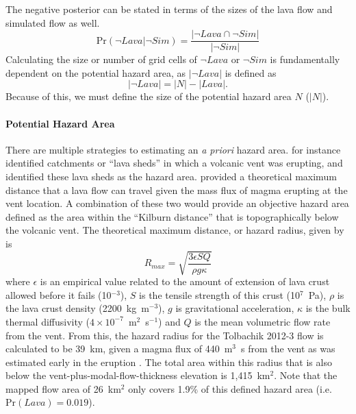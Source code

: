 \documentclass[12pt,letter]{article}
\begin{document}
		The negative posterior can be stated in terms of the sizes of the lava flow and simulated flow as well.
		\begin{equation}
			\text{Pr}(\neg Lava|\neg Sim)=\frac{|\neg Lava\cap \neg Sim|}{|\neg Sim|}\label{eq_simplenegpost}
		\end{equation}
		Calculating the size or number of grid cells of $\neg Lava$ or $\neg Sim$ is fundamentally dependent on the potential hazard area, as $|\neg Lava|$ is defined as
		\begin{equation}
			|\neg Lava| = |N| - |Lava|.
		\end{equation}
		Because of this, we must define the size of the potential hazard area $N$ ($|N|$).	
	
	\paragraph{Potential Hazard Area} There are multiple strategies to estimating an \textit{a priori} hazard area. \citet{kauahikaua1995applications} for instance identified catchments or ``lava sheds'' in which a volcanic vent was erupting, and identified these lava sheds as the hazard area. \citet{kilburn2000lava} provided a theoretical maximum distance that a lava flow can travel given the mass flux of magma erupting at the vent location. A combination of these two would provide an objective hazard area defined as the area within the ``Kilburn distance'' that is topographically below the volcanic vent. The theoretical maximum distance, or hazard radius, given by \citet{kilburn2000lava} is
		\begin{equation}
		R_{max}=\sqrt{\frac{3\epsilon SQ}{\rho g\kappa}}
		\end{equation}
	where $\epsilon$ is an empirical value related to the amount of extension of lava crust allowed before it fails (10$^{-3}$), $S$ is the tensile strength of this crust (10$^7$~Pa), $\rho$ is the lava crust density (2200~kg~m$^{-3}$), $g$ is gravitational acceleration, $\kappa$ is the bulk thermal diffusivity ($4\times 10^{-7}$~m$^{2}$~s$^{-1}$) and $Q$ is the mean volumetric flow rate from the vent. From this, the hazard radius for the Tolbachik 2012-3 flow is calculated to be 39~km, given a magma flux of 440~m$^3$~s from the vent as was estimated early in the eruption \citep{belousov2015overview}. The total area within this radius that is also below the vent-plus-modal-flow-thickness elevation is 1,415~km$^2$. Note that the mapped flow area of 26~km$^2$ only covers 1.9\% of this defined hazard area (i.e. $\text{Pr}(Lava) = 0.019$).
	
\end{document}
